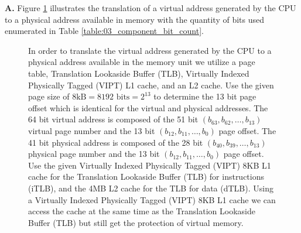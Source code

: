 \documentclass[main.tex]{subfiles}
\begin{document}
\begin{enumerate}
    \textbf{A.} Figure \ref{fig:03_translation_general} illustrates the translation of a virtual address generated by the CPU to a physical address available in memory with the quantity of bits used enumerated in Table \ref{table:03_component_bit_count}. 
    
    \begin{figure}
    \centering{}
    \caption{In order to translate the virtual address generated by the CPU to a physical address available in the memory unit we utilize a page table, Translation Lookaside Buffer (TLB), Virtually Indexed Physically Tagged (VIPT) L1 cache, and an L2 cache. Use the given page size of $8\text{kB} = 8192 \text{ bits} = 2^{13}$  to determine the 13 bit page offset which is identical for the virtual and physical addresses. The 64 bit virtual address is composed of the 51 bit $\left(b_{63},b_{62},\dots,b_{13}\right)$ virtual page number and the 13 bit $\left(b_{12},b_{11},\dots,b_{0}\right)$ page offset. The 41 bit physical address is composed of the 28 bit $\left(b_{40},b_{39},\dots,b_{13}\right)$ physical page number and the 13 bit $\left(b_{12},b_{11},\dots,b_{0}\right)$ page offset. Use the given Virtually Indexed Physically Tagged (VIPT) 8KB L1 cache for the Translation Lookaside Buffer (TLB) for instructions (iTLB), and the 4MB L2 cache for the TLB for data (dTLB). Using a Virtually Indexed Physically Tagged (VIPT) 8KB L1 cache we can access the cache at the same time as the Translation Lookaside Buffer (TLB) but still get the protection of virtual memory.}
    \label{fig:03_translation_general}
    \end{figure}
    

\end{enumerate}
\end{document}
